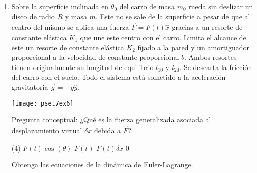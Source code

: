 \documentclass[11pt,spanish,a4paper]{article}
\begin{document}
\begin{enumerate}
\item
\begin{minipage}[t][6cm]{0.5\textwidth}
Sobre la superficie inclinada en $\theta_0$ del carro de masa $m_0$ rueda sin deslizar un disco de radio $R$ y masa $m$.
Este no se sale de la superficie a pesar de que al centro del mismo se aplica una fuerza $\vec{F}= F(t) \hat{x}$ gracias a un resorte de constante elástica $K_1$ que une este centro con el carro.
Limita el alcance de este un resorte de constante elástica $K_2$ fijado a la pared y un amortiguador proporcional a la velocidad de constante proporcional $b$.
Ambos resortes tienen originalmente su longitud de equilibrio $l_{10}$ y $l_{20}$.
Se descarta la fricción del carro con el suelo.
Todo el sistema está sometido a la aceleración gravitatoria $\vec{g}= - g \hat{y}$.\\
\end{minipage}
\begin{minipage}[c][0cm][t]{0.45\textwidth}
	\texttt{[image: pset7ex6]}
\end{minipage}
Pregunta conceptual: ¿Qué es la fuerza generalizada asociada al desplazamiento virtual $\delta x$ debida a $\vec{F}$?\\
\begin{tasks}(4)
	\task $F(t) \cos(\theta)$
	\task $F(t)$
	\task $F(t) \delta x$
	\task $0$
\end{tasks}
Obtenga las ecuaciones de la dinámica de Euler-Lagrange. 



\end{enumerate}
\end{document}
